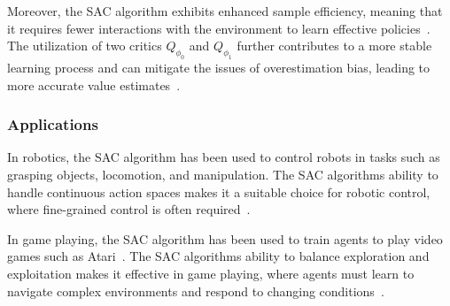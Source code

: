 Moreover, the SAC algorithm exhibits enhanced sample efficiency, meaning that it requires fewer interactions with the environment to learn effective policies~\cite{SAC_Applications_Paper}. The utilization of two critics $Q_{\phi_0}$ and $Q_{\phi_1}$ further contributes to a more stable learning process and can mitigate the issues of overestimation bias, leading to more accurate value estimates~\cite{SAC_Paper}.

\subsubsection{Applications}


In robotics, the SAC algorithm has been used to control robots in tasks such as grasping objects, locomotion, and manipulation. The SAC algorithms ability to handle continuous action spaces makes it a suitable choice for robotic control, where fine-grained control is often required~\cite{SAC_Applications_Paper}.

In game playing, the SAC algorithm has been used to train agents to play video games such as Atari~\cite{SAC_Discrete_Paper}. The SAC algorithms ability to balance exploration and exploitation makes it effective in game playing, where agents must learn to navigate complex environments and respond to changing conditions~\cite{SAC_VideoGames_Paper}.

% 

% 

